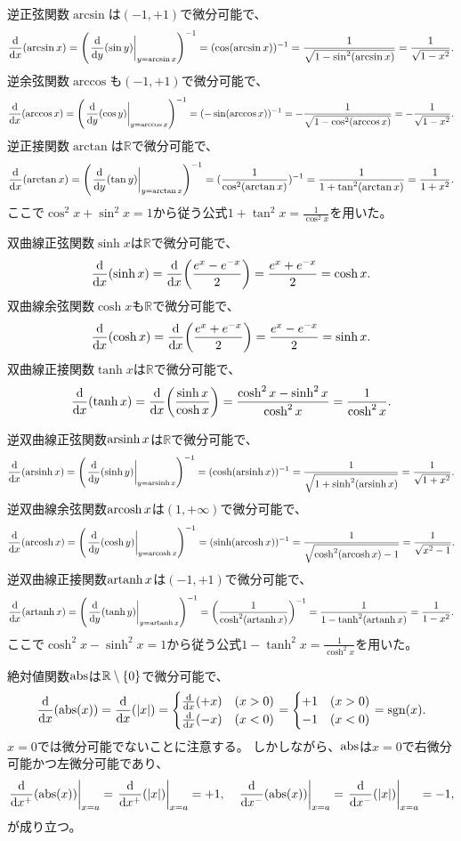 逆正弦関数$\arcsin$は$(-1, +1)$で微分可能で、
$$
\dv{x}(\arcsin x)
= \qty(\eval{\dv{y}(\sin y)}_{y = \arcsin x})^{-1}
= (\cos(\arcsin x))^{-1}
= \frac{1}{\sqrt{1-\sin^2(\arcsin x)}}
= \frac{1}{\sqrt{1-x^2}}.
$$
逆余弦関数$\arccos$も$(-1, +1)$で微分可能で、
$$
\dv{x}(\arccos x)
= \qty(\eval{\dv{y}(\cos y)}_{y = \arccos x})^{-1}
= (-\sin(\arccos x))^{-1}
= -\frac{1}{\sqrt{1-\cos^2(\arccos x)}}
= -\frac{1}{\sqrt{1-x^2}}.
$$
逆正接関数$\arctan$は$\mathbb{R}$で微分可能で、
$$
\dv{x}(\arctan x)
= \qty(\eval{\dv{y}(\tan y)}_{y = \arctan x})^{-1}
= (\frac{1}{\cos^2(\arctan x)})^{-1}
= \frac{1}{1+\tan^2(\arctan x)}
= \frac{1}{1+x^2}.
$$
ここで$\cos^2 x+\sin^2 x = 1$から従う公式$1+\tan^2 x = \frac{1}{\cos^2 x}$を用いた。

双曲線正弦関数$\sinh x$は$\mathbb{R}$で微分可能で、
$$
\dv{x}(\sinh x)
= \dv{x}\qty(\frac{e^x-e^{-x}}{2})
= \frac{e^x+e^{-x}}{2}
= \cosh x.
$$
双曲線余弦関数$\cosh x$も$\mathbb{R}$で微分可能で、
$$
\dv{x}(\cosh x)
= \dv{x}\qty(\frac{e^x+e^{-x}}{2})
= \frac{e^x-e^{-x}}{2}
= \sinh x.
$$
双曲線正接関数$\tanh x$は$\mathbb{R}$で微分可能で、
$$
\dv{x}(\tanh x)
= \dv{x}\qty(\frac{\sinh x}{\cosh x})
= \frac{\cosh^2 x-\sinh^2 x}{\cosh^2 x}
= \frac{1}{\cosh^2 x}.
$$

逆双曲線正弦関数$\operatorname{arsinh} x$は$\mathbb{R}$で微分可能で、
$$
\dv{x}(\arsinh x)
= \qty(\eval{\dv{y}(\sinh y)}_{y = \arsinh x})^{-1}
= (\cosh(\arsinh x))^{-1}
= \frac{1}{\sqrt{1+\sinh^2(\arsinh x)}}
= \frac{1}{\sqrt{1+x^2}}.
$$
逆双曲線余弦関数$\operatorname{arcosh} x$は$(1, +\infty)$で微分可能で、
$$
\dv{x}(\arcosh x)
= \qty(\eval{\dv{y}(\cosh y)}_{y = \arcosh x})^{-1}
= (\sinh(\arcosh x))^{-1}
= \frac{1}{\sqrt{\cosh^2(\arcosh x)-1}}
= \frac{1}{\sqrt{x^2-1}}.
$$
逆双曲線正接関数$\operatorname{artanh} x$は$(-1, +1)$で微分可能で、
$$
\dv{x}(\artanh x)
= \qty(\eval{\dv{y}(\tanh y)}_{y = \artanh x})^{-1}
= \qty(\frac{1}{\cosh^2(\artanh x)})^{-1}
= \frac{1}{1-\tanh^2(\artanh x)}
= \frac{1}{1-x^2}.
$$
ここで$\cosh^2 x-\sinh^2 x = 1$から従う公式$1-\tanh^2 x = \frac{1}{\cosh^2 x}$を用いた。

絶対値関数$\operatorname{abs}$は$\mathbb{R}\setminus\{0\}$で微分可能で、
$$
\dv{x}(\operatorname{abs}(x))
= \dv{x}(|x|)
=
\begin{cases}
\dv{x}(+x) & (x > 0) \\
\dv{x}(-x) & (x < 0) \\
\end{cases}
=
\begin{cases}
+1 & (x > 0) \\
-1 & (x < 0) \\
\end{cases}
= \operatorname{sgn}(x).
$$
$x = 0$では微分可能でないことに注意する。
しかしながら、$\operatorname{abs}$は$x = 0$で右微分可能かつ左微分可能であり、
$$
\eval{\dv{x^+}(\opabs(x))}_{x = a} = \eval{\dv{x^+}(|x|)}_{x = a} = +1,
\quad \eval{\dv{x^-}(\opabs(x))}_{x = a} = \eval{\dv{x^-}(|x|)}_{x = a} = -1,
$$
が成り立つ。

